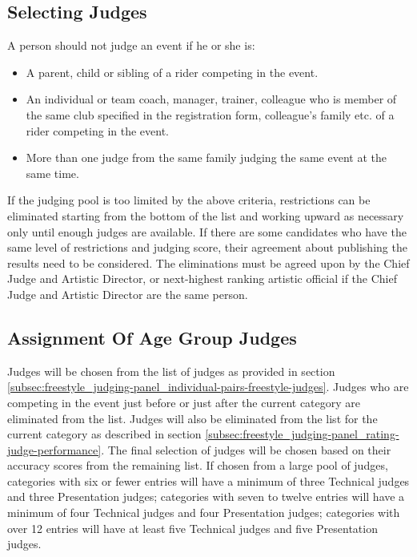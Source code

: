 \subsection{Selecting Judges \label{subsec:freestyle_judging-panel_selecting-judges}}
A person should not judge an event if he or she is:
\begin{itemize}
\item A parent, child or sibling of a rider competing in the event.
\item An individual or team coach, manager, trainer, colleague who is member of the same club specified in the registration form, colleague's family etc.
of a rider competing in the event.
\item More than one judge from the same family judging the same event at the same time.
\end{itemize}
If the judging pool is too limited by the above criteria, restrictions can be eliminated starting from the bottom of the list and working upward as necessary only until enough judges are available.
If there are some candidates who have the same level of restrictions and judging score, their agreement about publishing the results need to be considered.
The eliminations must be agreed upon by the Chief Judge and Artistic Director, or next-highest ranking artistic official if the Chief Judge and Artistic Director are the same person.

\subsection{Assignment Of Age Group Judges}
Judges will be chosen from the list of judges as provided in section \ref{subsec:freestyle_judging-panel_individual-pairs-freestyle-judges}.
Judges who are competing in the event just before or just after the current category are eliminated from the list.
Judges will also be eliminated from the list for the current category as described in section \ref{subsec:freestyle_judging-panel_rating-judge-performance}.
The final selection of judges will be chosen based on their accuracy scores from the remaining list.
If chosen from a large pool of judges, categories with six or fewer entries will have a minimum of three Technical judges and three Presentation judges; categories with seven to twelve entries will have a minimum of four Technical judges and four Presentation judges; categories with over 12 entries will have at least five Technical judges and five Presentation judges.

